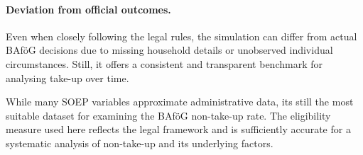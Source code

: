 \paragraph{Deviation from official outcomes.}
Even when closely following the legal rules, the simulation can differ from actual BAföG decisions due to missing household details or unobserved individual circumstances. Still, it offers a consistent and transparent benchmark for analysing take-up over time.

While many SOEP variables approximate administrative data, its still the most suitable dataset for examining the BAföG non-take-up rate. 
The eligibility measure used here reflects the legal framework and is sufficiently accurate for a systematic analysis of non-take-up and its underlying factors.

